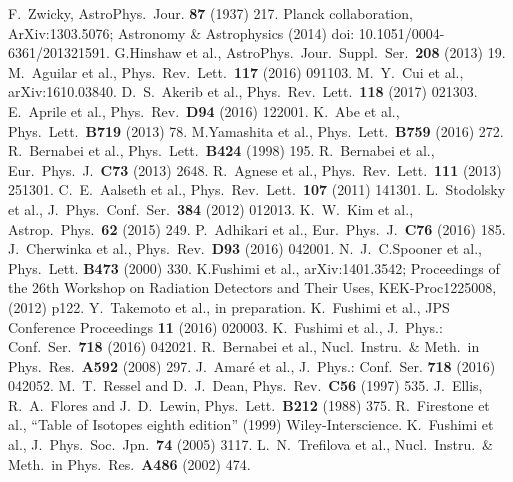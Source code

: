 \documentclass{jpsj-suppl} %
\begin{document}
\begin{thebibliography}{99}
 F.~Zwicky, AstroPhys.~Jour. \textbf{87} (1937) 217.
 Planck collaboration, ArXiv:1303.5076; Astronomy \& Astrophysics (2014) doi: 10.1051/0004-6361/201321591.
 G.Hinshaw et al., AstroPhys.~Jour.~Suppl.~Ser.~\textbf{208} (2013) 19.
 M.~Aguilar et al., Phys.~Rev.~Lett.~\textbf{117} (2016) 091103.
 M.~Y.~Cui et al., arXiv:1610.03840.
 D.~S.~Akerib et al., Phys.~Rev.~Lett.~\textbf{118} (2017) 021303.
 E.~Aprile et al., Phys.~Rev.~\textbf{D94} (2016) 122001.
 K.~Abe et al., Phys.~Lett.~\textbf{B719} (2013) 78.
 M.Yamashita et al.,  Phys.~Lett.~\textbf{B759} (2016) 272.
 R.~Bernabei et al., Phys.~Lett.~\textbf{B424} (1998) 195.
 R.~Bernabei et al., Eur.~Phys.~J.~\textbf{C73} (2013) 2648.
 R.~Agnese et al., Phys.~Rev.~Lett.~\textbf{111} (2013) 251301.
 C.~E.~Aalseth et al., Phys.~Rev.~Lett.~\textbf{107} (2011) 141301.
 L.~Stodolsky et al., J.~Phys.~Conf.~Ser.~\textbf{384} (2012) 012013.
K.~W.~Kim et al., Astrop.~Phys.~\textbf{62} (2015) 249.
 P.~Adhikari et al., Eur.~Phys.~J.~\textbf{C76} (2016) 185.
 J.~Cherwinka et al., Phys.~Rev.~\textbf{D93} (2016) 042001.
 N.~J.~C.Spooner et al., Phys.~Lett. \textbf{B473} (2000) 330.
 K.Fushimi et al., arXiv:1401.3542; Proceedings of the 26th Workshop on Radiation Detectors and Their Uses, KEK-Proc1225008, (2012) p122.
 Y.~Takemoto et al., in preparation.
 K.~Fushimi et al., JPS Conference Proceedings \textbf{11} (2016) 020003.
 K.~Fushimi et al., J.~Phys.: Conf.~Ser.~\textbf{718}
 (2016) 042021.
 R.~Bernabei et al., Nucl.~Instru.~\& Meth.~in Phys.~Res.~\textbf{A592} 
 (2008) 297.
 J.~Amar\'{e} et al., J.~Phys.: Conf.~Ser. \textbf{718} (2016) 042052.
 M.~T.~Ressel and D.~J.~Dean, Phys.~Rev.~\textbf{C56} (1997) 535.
 J.~Ellis, R.~A.~Flores and J.~D.~Lewin, Phys.~Lett.~\textbf{B212} (1988) 375.
 R.~Firestone et al., ``Table of Isotopes eighth edition'' (1999) Wiley-Interscience.
 K.~Fushimi et al., J.~Phys.~Soc.~Jpn.~\textbf{74} (2005) 3117.
 L.~N.~Trefilova et al.,  Nucl.~Instru.~\& Meth.~in Phys.~Res.~\textbf{A486} 
 (2002) 474.

\end{thebibliography}
\end{document}
